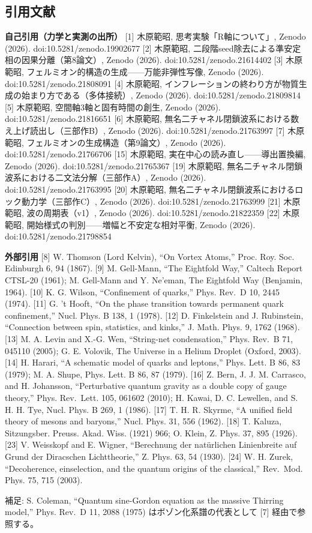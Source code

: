 \documentclass[
]{ltjarticle}
\begin{document}
\subsection{引用文献}\label{ux5f15ux7528ux6587ux732e}

\textbf{自己引用（力学と実測の出所）} {[}1{]} 木原範昭,
思考実験「R軸について」, Zenodo (2026). doi:10.5281/zenodo.19902677
{[}2{]} 木原範昭, 二段階seed除去による準安定相の因果分離（第8論文）,
Zenodo (2026). doi:10.5281/zenodo.21614402 {[}3{]} 木原範昭,
フェルミオン的構造の生成------万能非弾性写像, Zenodo (2026).
doi:10.5281/zenodo.21808091 {[}4{]} 木原範昭,
インフレーションの終わり方が物質生成の始まり方である（多体接続）, Zenodo
(2026). doi:10.5281/zenodo.21809814 {[}5{]} 木原範昭,
空間軸3軸と固有時間の創生, Zenodo (2026). doi:10.5281/zenodo.21816651
{[}6{]} 木原範昭,
無名二チャネル閉鎖波系における数え上げ読出し（三部作B）, Zenodo (2026).
doi:10.5281/zenodo.21763997 {[}7{]} 木原範昭,
フェルミオンの生成構造（第9論文）, Zenodo (2026).
doi:10.5281/zenodo.21766706 {[}15{]} 木原範昭,
実在中心の読み直し------導出置換編, Zenodo (2026).
doi:10.5281/zenodo.21765367 {[}19{]} 木原範昭,
無名二チャネル閉鎖波系における二文法分解（三部作A）, Zenodo (2026).
doi:10.5281/zenodo.21763995 {[}20{]} 木原範昭,
無名二チャネル閉鎖波系におけるロック動力学（三部作C）, Zenodo (2026).
doi:10.5281/zenodo.21763999 {[}21{]} 木原範昭, 波の周期表（v1）, Zenodo
(2026). doi:10.5281/zenodo.21822359 {[}22{]} 木原範昭,
開始様式の判別------増幅と不安定な相対平衡, Zenodo (2026).
doi:10.5281/zenodo.21798854

\textbf{外部引用} {[}8{]} W. Thomson (Lord Kelvin), ``On Vortex Atoms,''
Proc. Roy. Soc. Edinburgh 6, 94 (1867). {[}9{]} M. Gell-Mann, ``The
Eightfold Way,'' Caltech Report CTSL-20 (1961); M. Gell-Mann and Y.
Ne'eman, The Eightfold Way (Benjamin, 1964). {[}10{]} K. G. Wilson,
``Confinement of quarks,'' Phys. Rev.~D 10, 2445 (1974). {[}11{]} G. 't
Hooft, ``On the phase transition towards permanent quark confinement,''
Nucl. Phys. B 138, 1 (1978). {[}12{]} D. Finkelstein and J. Rubinstein,
``Connection between spin, statistics, and kinks,'' J. Math. Phys. 9,
1762 (1968). {[}13{]} M. A. Levin and X.-G. Wen, ``String-net
condensation,'' Phys. Rev.~B 71, 045110 (2005); G. E. Volovik, The
Universe in a Helium Droplet (Oxford, 2003). {[}14{]} H. Harari, ``A
schematic model of quarks and leptons,'' Phys. Lett. B 86, 83 (1979); M.
A. Shupe, Phys. Lett. B 86, 87 (1979). {[}16{]} Z. Bern, J. J. M.
Carrasco, and H. Johansson, ``Perturbative quantum gravity as a double
copy of gauge theory,'' Phys. Rev.~Lett. 105, 061602 (2010); H. Kawai,
D. C. Lewellen, and S. H. H. Tye, Nucl. Phys. B 269, 1 (1986). {[}17{]}
T. H. R. Skyrme, ``A unified field theory of mesons and baryons,'' Nucl.
Phys. 31, 556 (1962). {[}18{]} T. Kaluza, Sitzungsber. Preuss. Akad.
Wiss. (1921) 966; O. Klein, Z. Phys. 37, 895 (1926). {[}23{]} V.
Weisskopf and E. Wigner, ``Berechnung der natürlichen Linienbreite auf
Grund der Diracschen Lichttheorie,'' Z. Phys. 63, 54 (1930). {[}24{]} W.
H. Zurek, ``Decoherence, einselection, and the quantum origins of the
classical,'' Rev.~Mod. Phys. 75, 715 (2003).

補足: S. Coleman, ``Quantum sine-Gordon equation as the massive Thirring
model,'' Phys. Rev.~D 11, 2088 (1975) はボゾン化系譜の代表として {[}7{]}
経由で参照する。
\end{document}
